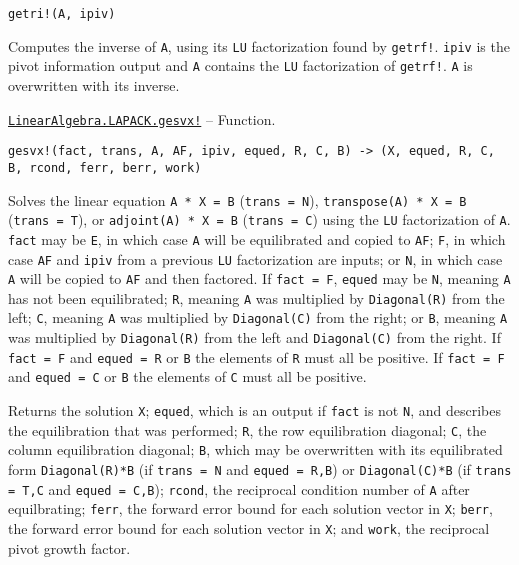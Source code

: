 \begin{adjustwidth}{2em}{0pt}


\begin{verbatim}
getri!(A, ipiv)
\end{verbatim}

Computes the inverse of \texttt{A}, using its \texttt{LU} factorization found by \texttt{getrf!}. \texttt{ipiv} is the pivot information output and \texttt{A} contains the \texttt{LU} factorization of \texttt{getrf!}. \texttt{A} is overwritten with its inverse.



\end{adjustwidth}
\hypertarget{11990298428229663507}{}
\hyperlink{11990298428229663507}{\texttt{LinearAlgebra.LAPACK.gesvx!}}  -- {Function.}

\begin{adjustwidth}{2em}{0pt}


\begin{verbatim}
gesvx!(fact, trans, A, AF, ipiv, equed, R, C, B) -> (X, equed, R, C, B, rcond, ferr, berr, work)
\end{verbatim}

Solves the linear equation \texttt{A * X = B} (\texttt{trans = N}), \texttt{transpose(A) * X = B} (\texttt{trans = T}), or \texttt{adjoint(A) * X = B} (\texttt{trans = C}) using the \texttt{LU} factorization of \texttt{A}. \texttt{fact} may be \texttt{E}, in which case \texttt{A} will be equilibrated and copied to \texttt{AF}; \texttt{F}, in which case \texttt{AF} and \texttt{ipiv} from a previous \texttt{LU} factorization are inputs; or \texttt{N}, in which case \texttt{A} will be copied to \texttt{AF} and then factored. If \texttt{fact = F}, \texttt{equed} may be \texttt{N}, meaning \texttt{A} has not been equilibrated; \texttt{R}, meaning \texttt{A} was multiplied by \texttt{Diagonal(R)} from the left; \texttt{C}, meaning \texttt{A} was multiplied by \texttt{Diagonal(C)} from the right; or \texttt{B}, meaning \texttt{A} was multiplied by \texttt{Diagonal(R)} from the left and \texttt{Diagonal(C)} from the right. If \texttt{fact = F} and \texttt{equed = R} or \texttt{B} the elements of \texttt{R} must all be positive. If \texttt{fact = F} and \texttt{equed = C} or \texttt{B} the elements of \texttt{C} must all be positive.

Returns the solution \texttt{X}; \texttt{equed}, which is an output if \texttt{fact} is not \texttt{N}, and describes the equilibration that was performed; \texttt{R}, the row equilibration diagonal; \texttt{C}, the column equilibration diagonal; \texttt{B}, which may be overwritten with its equilibrated form \texttt{Diagonal(R)*B} (if \texttt{trans = N} and \texttt{equed = R,B}) or \texttt{Diagonal(C)*B} (if \texttt{trans = T,C} and \texttt{equed = C,B}); \texttt{rcond}, the reciprocal condition number of \texttt{A} after equilbrating; \texttt{ferr}, the forward error bound for each solution vector in \texttt{X}; \texttt{berr}, the forward error bound for each solution vector in \texttt{X}; and \texttt{work}, the reciprocal pivot growth factor.





\end{adjustwidth}
